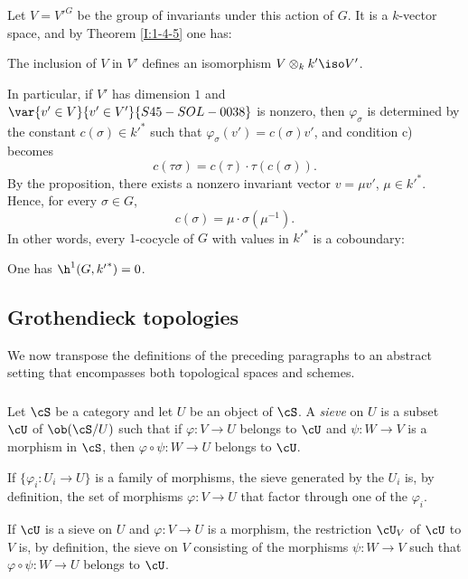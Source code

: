 Let $V={V'}^G$ be the group of invariants under this action of $G$. It
is a $k$-vector space, and by Theorem \ref{I:1-4-5} one has:

\begin{proposition}\label{I:1-5-2}
The inclusion of $V$ in $V'$ defines an isomorphism
$V\otimes_k k'\iso V'$.
\end{proposition}

In particular, if $V'$ has dimension $1$ and $\var{v'\in V}{v'\in V'}{S45-SOL-0038}$ is nonzero, then
$\varphi_\sigma$ is determined by the constant
$c(\sigma)\in {k'}^*$ such that
$\varphi_\sigma(v')=c(\sigma)v'$, and condition c) becomes
\[
  c(\tau\sigma) = c(\tau)\cdot \tau(c(\sigma))\text{.}
\]
By the proposition, there exists a nonzero invariant vector
$v=\mu v'$, $\mu\in {k'}^*$. Hence, for every $\sigma\in G$,
\[
  c(\sigma) = \mu\cdot \sigma(\mu^{-1})\text{.}
\]
In other words, every $1$-cocycle of $G$ with values in
${k'}^*$ is a coboundary:

\begin{corollary}\label{I:1-5-3}
One has $\h^1(G,{k'}^*)=0$.
\end{corollary}

\subsection{Grothendieck topologies}\label{I:1-6}

We now transpose the definitions of the preceding paragraphs to an
abstract setting that encompasses both topological spaces and schemes.

\subsubsection{}\label{I:1-6-1}

Let $\cS$ be a category and let $U$ be an object of $\cS$. A
\emph{sieve} on $U$ is a subset $\cU$ of $\ob(\cS/U)$ such that if
$\varphi:V\to U$ belongs to $\cU$ and $\psi:W\to V$ is a morphism in
$\cS$, then $\varphi\circ\psi:W\to U$ belongs to $\cU$.

If $\{\varphi_i:U_i\to U\}$ is a family of morphisms, the sieve generated
by the $U_i$ is, by definition, the set of morphisms $\varphi:V\to U$
that factor through one of the $\varphi_i$.

If $\cU$ is a sieve on $U$ and $\varphi:V\to U$ is a morphism, the
restriction $\cU_V$ of $\cU$ to $V$ is, by definition, the sieve on
$V$ consisting of the morphisms $\psi:W\to V$ such that
$\varphi\circ\psi:W\to U$ belongs to $\cU$.

